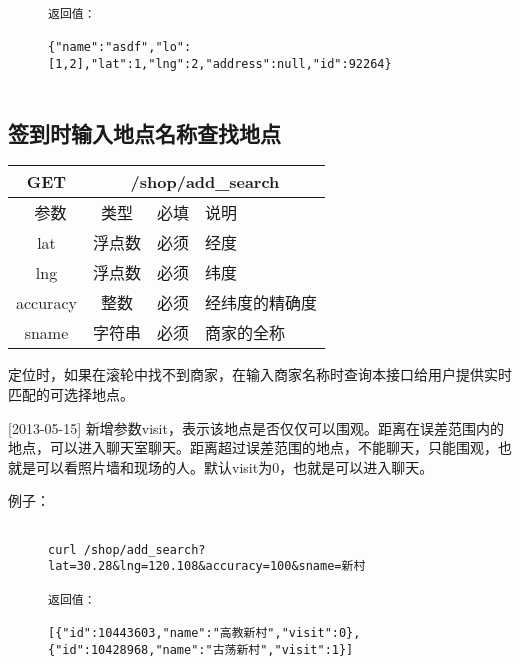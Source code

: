 \documentclass[cs4size]{ctexartutf8}
\begin{document}
\begin{figure}[H]
\begin{verbatim}
返回值：

{"name":"asdf","lo":[1,2],"lat":1,"lng":2,"address":null,"id":92264}


\end{verbatim}
\end{figure}



\subsection{签到时输入地点名称查找地点}

\begin{table}[H]
   \begin{center}
\begin{tabular}{|c|c|c|p{12cm}|}
\hline
GET & \multicolumn{3}{|c|}{/shop/add\_search} \\
\hline\hline
 \  参数  & 类型 & 必填 &  说明  \\
\hline
 lat  & 浮点数 & 必须 & 经度\\
\hline
 lng  &  浮点数 & 必须 & 纬度\\ 
\hline
 accuracy  & 整数 & 必须 & 经纬度的精确度\\ 
\hline
 sname  & 字符串 & 必须 &  商家的全称\\  
\hline
\end{tabular}
   \end{center}
\end{table}

定位时，如果在滚轮中找不到商家，在输入商家名称时查询本接口给用户提供实时匹配的可选择地点。

[2013-05-15] 新增参数visit，表示该地点是否仅仅可以围观。距离在误差范围内的地点，可以进入聊天室聊天。距离超过误差范围的地点，不能聊天，只能围观，也就是可以看照片墙和现场的人。默认visit为0，也就是可以进入聊天。

例子：

\begin{figure}[H]
\begin{verbatim}

curl /shop/add_search?lat=30.28&lng=120.108&accuracy=100&sname=新村

返回值：

[{"id":10443603,"name":"高教新村","visit":0},{"id":10428968,"name":"古荡新村","visit":1}]

\end{verbatim}
\end{figure}
\end{document}
